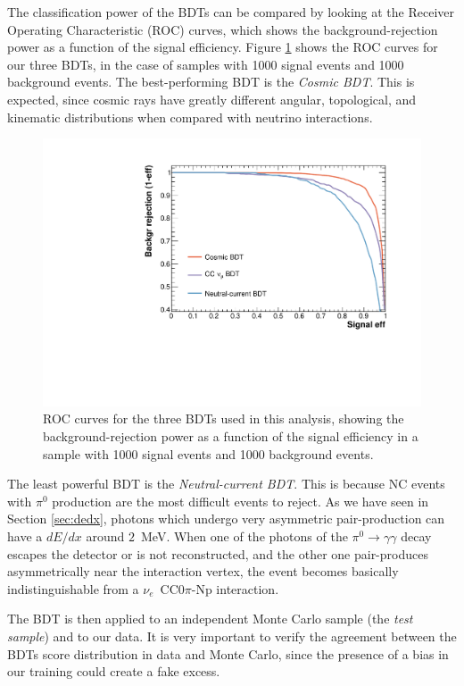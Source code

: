 The classification power of the BDTs can be compared by looking at the Receiver Operating Characteristic (ROC) curves, which shows the background-rejection power as a function of the signal efficiency. Figure \ref{fig:roc} shows the ROC curves for our three BDTs, in the case of samples with 1000 signal events and 1000 background events. The best-performing BDT is the \emph{Cosmic BDT}. This is expected, since cosmic rays have greatly different angular, topological, and kinematic distributions when compared with neutrino interactions. 

\begin{figure}[htbp]
\centering
  \includegraphics[width=0.75\linewidth]{figures/roc.pdf}
  \caption{ROC curves for the three BDTs used in this analysis, showing the background-rejection power as a function of the signal efficiency in a sample with 1000 signal events and 1000 background events.}\label{fig:roc}
\end{figure}

The least powerful BDT is the \emph{Neutral-current BDT}. This is because NC events with $\pi^0$ production are the most difficult events to reject. As we have seen in Section \ref{sec:dedx}, photons which undergo very asymmetric pair-production can have a $dE/dx$ around $2$~MeV. When one of the photons of the $\pi^0\rightarrow\gamma\gamma$ decay escapes the detector or is not reconstructed, and the other one pair-produces asymmetrically near the interaction vertex, the event becomes basically indistinguishable from a $\nu_e$~CC0$\pi$-Np interaction.

The BDT is then applied to an independent Monte Carlo sample (the \emph{test sample}) and to our data. It is very important to verify the agreement between the BDTs score distribution in data and Monte Carlo, since the presence of a bias in our training could create a fake excess.

